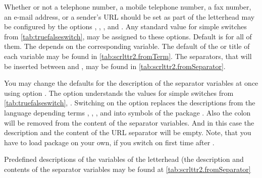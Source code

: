 %
%
%
%
Whether or not a telephone number, a
mobile telephone number, a fax number, an
e-mail address, or a sender's URL should be set as part of the
letterhead may be configured by the options ,
, , and . Any standard value
for simple switches from \autoref{tab:truefalseswitch},
 may be assigned to these options. Default is
 for all of them. The  depends on the
corresponding variable. The default of the  or title of
each variable may be found in \autoref{tab:scrlttr2.fromTerm}. The separators,
that will be inserted between  and , may be
found in \autoref{tab:scrlttr2.fromSeparator}.

You may
change the defaults for the description of the separator variables at once
using option . The option understands the values for
simple switches from \autoref{tab:truefalseswitch},
. Switching on the option replaces the
descriptions from the language depending terms ,
, , and  into symbols
of the package . Also the colon will
be removed from the content of the separator variables. And in this case the
description and the content of the URL separator will be
empty. Note, that you have to load package
 on your own, if you switch on 
first time after .

\begin{table}
  \centering
  \caption[{Predefined descriptions of the variables of the
    letterhead}]{Predefined descriptions of the variables of the letterhead
    (the description and contents of the separator variables may be found at
    \autoref{tab:scrlttr2.fromSeparator}}
  \begin{desctabular}[1.8em]
  \end{desctabular}
  \label{tab:scrlttr2.fromTerm}
\end{table}

